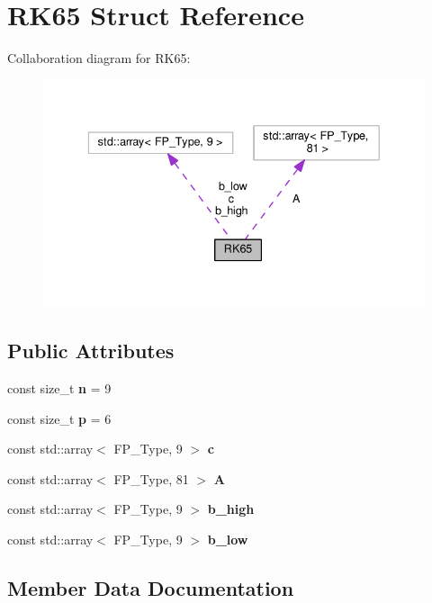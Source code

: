 \hypertarget{structRK65}{}\section{R\+K65 Struct Reference}
\label{structRK65}


Collaboration diagram for R\+K65\+:\nopagebreak
\begin{figure}[H]
\begin{center}
\leavevmode
\includegraphics[width=336pt]{structRK65__coll__graph}
\end{center}
\end{figure}
\subsection*{Public Attributes}
\begin{DoxyCompactItemize}
\item 
\mbox{\label{structRK65_ad00bda06b6a7c74d83b34c2af2249df9}} 
const size\+\_\+t {\bfseries n} = 9
\item 
\mbox{\label{structRK65_aa74cc748421b30c372777ae98ead9404}} 
const size\+\_\+t {\bfseries p} = 6
\item 
const std\+::array$<$ F\+P\+\_\+\+Type, 9 $>$ {\bfseries c}
\item 
const std\+::array$<$ F\+P\+\_\+\+Type, 81 $>$ {\bfseries A}
\item 
const std\+::array$<$ F\+P\+\_\+\+Type, 9 $>$ {\bfseries b\+\_\+high}
\item 
const std\+::array$<$ F\+P\+\_\+\+Type, 9 $>$ {\bfseries b\+\_\+low}
\end{DoxyCompactItemize}


\subsection{Member Data Documentation}
\mbox{\label{structRK65_a54dd53be90cfb257d7739443220c833f}} 
